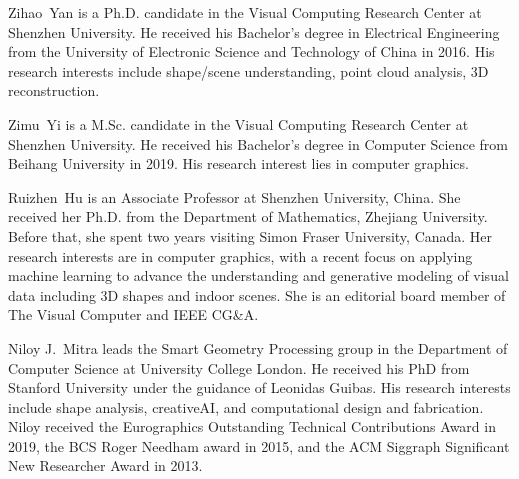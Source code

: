 \documentclass[10pt,journal,compsoc]{IEEEtran}
\begin{document}



\begin{IEEEbiography}{Zihao~Yan}
	is a Ph.D. candidate in the Visual Computing Research Center at Shenzhen University. He received his Bachelor's degree in Electrical Engineering from the University of Electronic Science and Technology of China in 2016. His research interests include shape/scene understanding, point cloud analysis, 3D reconstruction.
\end{IEEEbiography}


\begin{IEEEbiography}{Zimu~Yi}
	is a M.Sc. candidate in the Visual Computing Research Center at Shenzhen University. He received his Bachelor's degree in Computer Science from Beihang University in 2019. His research interest lies in computer graphics.
\end{IEEEbiography}


\begin{IEEEbiography}{Ruizhen~Hu}
	is an Associate Professor at Shenzhen University, China. She received her Ph.D. from the Department of Mathematics, Zhejiang University. Before that, she spent two years visiting Simon Fraser University, Canada. Her research interests are in computer graphics, with a recent focus on applying machine learning to advance the understanding and generative modeling of visual data including 3D shapes and indoor scenes. She is an editorial board member of The Visual Computer and IEEE CG\&A.
\end{IEEEbiography}


\begin{IEEEbiography}{Niloy J.~Mitra}
	leads the Smart Geometry Processing group in the Department of Computer Science at University College London. He received his PhD from Stanford University under the guidance of Leonidas Guibas. His research interests include shape analysis, creativeAI, and computational design and fabrication. Niloy received the Eurographics Outstanding Technical Contributions Award in 2019, the BCS Roger Needham award in 2015, and the ACM Siggraph Significant New Researcher Award in 2013.
\end{IEEEbiography}
\end{document}
